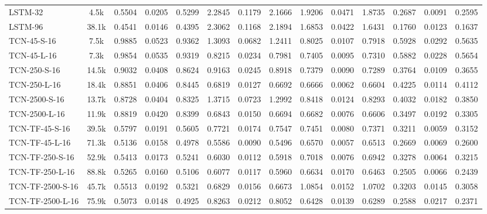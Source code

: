 \begin{table*}[h]
{\begin{tabular}{l c >{\columncolor{gray!20}}ccc >{\columncolor{gray!20}}ccc >{\columncolor{gray!20}}ccc >{\columncolor{gray!20}}ccc}
            \hline
            LSTM-32 & 4.5k & 0.5504 & 0.0205 & 0.5299 & 2.2845 & 0.1179 & 2.1666 & 1.9206 & 0.0471 & 1.8735 & 0.2687 & 0.0091 & 0.2595 \\ 
            LSTM-96 & 38.1k & 0.4541 & 0.0146 & 0.4395 & 2.3062 & 0.1168 & 2.1894 & 1.6853 & 0.0422 & 1.6431 & 0.1760 & 0.0123 & 0.1637 \\ 
            \hline
            TCN-45-S-16 & 7.5k & 0.9885 & 0.0523 & 0.9362 & 1.3093 & 0.0682 & 1.2411 & 0.8025 & 0.0107 & 0.7918 & 0.5928 & 0.0292 & 0.5635 \\ 
            TCN-45-L-16 & 7.3k & 0.9854 & 0.0535 & 0.9319 & 0.8215 & 0.0234 & 0.7981 & 0.7405 & 0.0095 & 0.7310 & 0.5882 & 0.0228 & 0.5654 \\
            TCN-250-S-16 & 14.5k & 0.9032 & 0.0408 & 0.8624 & 0.9163 & 0.0245 & 0.8918 & 0.7379 & 0.0090 & 0.7289 & 0.3764 & 0.0109 & 0.3655 \\ 
            TCN-250-L-16 & 18.4k & 0.8851 & 0.0406 & 0.8445 & 0.6819 & 0.0127 & 0.6692 & 0.6666 & 0.0062 & 0.6604 & 0.4225 & 0.0114 & 0.4112 \\
            TCN-2500-S-16 & 13.7k & 0.8728 & 0.0404 & 0.8325 & 1.3715 & 0.0723 & 1.2992 & 0.8418 & 0.0124 & 0.8293 & 0.4032 & 0.0182 & 0.3850 \\ 
            TCN-2500-L-16 & 11.9k & 0.8819 & 0.0420 & 0.8399 & 0.6843 & 0.0150 & 0.6694 & 0.6682 & 0.0076 & 0.6606 & 0.3497 & 0.0192 & 0.3305 \\
            \hline
            TCN-TF-45-S-16 & 39.5k & 0.5797 & 0.0191 & 0.5605 & 0.7721 & 0.0174 & 0.7547 & 0.7451 & 0.0080 & 0.7371 & 0.3211 & 0.0059 & 0.3152 \\
            TCN-TF-45-L-16 & 71.3k & 0.5136 & 0.0158 & 0.4978 & 0.5586 & 0.0090 & 0.5496 & 0.6570 & 0.0057 & 0.6513 & 0.2669 & 0.0069 & 0.2600 \\
            TCN-TF-250-S-16 & 52.9k & 0.5413 & 0.0173 & 0.5241 & 0.6030 & 0.0112 & 0.5918 & 0.7018 & 0.0076 & 0.6942 & 0.3278 & 0.0064 & 0.3215 \\
            TCN-TF-250-L-16 & 88.8k & 0.5265 & 0.0160 & 0.5106 & 0.6077 & 0.0117 & 0.5960 & 0.6634 & 0.0170 & 0.6463 & 0.2505 & 0.0066 & 0.2439 \\
            TCN-TF-2500-S-16 & 45.7k & 0.5513 & 0.0192 & 0.5321 & 0.6829 & 0.0156 & 0.6673 & 1.0854 & 0.0152 & 1.0702 & 0.3203 & 0.0145 & 0.3058 \\
            TCN-TF-2500-L-16 & 75.9k & 0.5073 & 0.0148 & 0.4925 & 0.8263 & 0.0212 & 0.8052 & 0.6428 & 0.0139 & 0.6289 & 0.2588 & 0.0217 & 0.2371 \\

\end{tabular}}
\end{table*}
